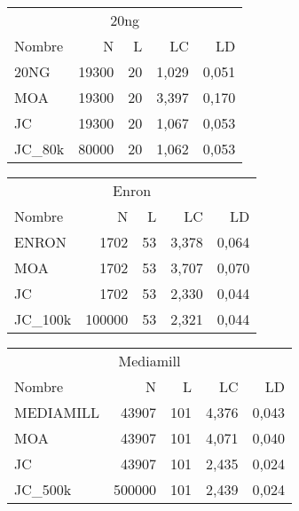 \begin{tabular}{lrrrr}
	\toprule
	\multicolumn{5}{c}{20ng}             \\
	Nombre  & N     & L  & LC    & LD    \\
	\midrule
	20NG    & 19300 & 20 & 1,029 & 0,051 \\
	MOA     & 19300 & 20 & 3,397 & 0,170 \\
	JC      & 19300 & 20 & 1,067 & 0,053 \\
	JC\_80k & 80000 & 20 & 1,062 & 0,053 \\
	\bottomrule
\end{tabular}
\begin{tabular}{lrrrr}
	\toprule
	\multicolumn{5}{c}{Enron}              \\
	Nombre   & N      & L  & LC    & LD    \\
	\midrule
	ENRON    & 1702   & 53 & 3,378 & 0,064 \\
	MOA      & 1702   & 53 & 3,707 & 0,070 \\
	JC       & 1702   & 53 & 2,330 & 0,044 \\
	JC\_100k & 100000 & 53 & 2,321 & 0,044 \\
	\bottomrule
\end{tabular}
\begin{tabular}{lrrrr}
	\toprule
	\multicolumn{5}{c}{Mediamill}            \\
	Nombre    & N      & L   & LC    & LD    \\
	\midrule
	MEDIAMILL & 43907  & 101 & 4,376 & 0,043 \\
	MOA       & 43907  & 101 & 4,071 & 0,040 \\
	JC        & 43907  & 101 & 2,435 & 0,024 \\
	JC\_500k  & 500000 & 101 & 2,439 & 0,024 \\
	\bottomrule
\end{tabular}
